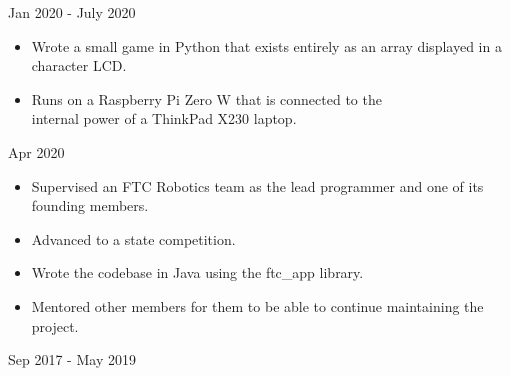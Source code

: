 \documentclass[11pt,letterpaper,ragged2e]{altacv}
\begin{document}
{Jan 2020 - July 2020}

{
\begin{itemize}
    \item Wrote a small game in Python that exists entirely as an array displayed in a character LCD.
    \item Runs on a Raspberry Pi Zero W that is connected to the \\ internal power of a ThinkPad X230 laptop.
\end{itemize}
}
{Apr 2020} \
{}

{
\begin{itemize}
    \item Supervised an FTC Robotics team as the lead programmer and one of its founding members.
    \item Advanced to a state competition.
    \item Wrote the codebase in Java using the ftc\_app library.
    \item Mentored other members for them to be able to continue maintaining the project.
\end{itemize}
}
{Sep 2017 - May 2019}




\end{document}
